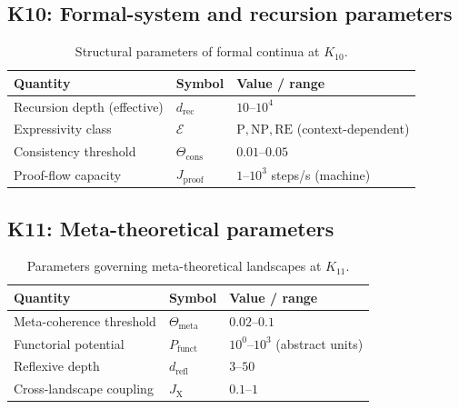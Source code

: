 
\subsection*{K10: Formal-system and recursion parameters}

\begin{table}[h]
  \centering
  \caption{Structural parameters of formal continua at \(K_{10}\).}
  \label{tab:k10-formal-parameters}
  \begin{tabular}{lll}
    \hline
    Quantity & Symbol & Value / range \\
    \hline
    Recursion depth (effective) & \(d_\mathrm{rec}\)
        & \(10\text{–}10^4\) \\
    Expressivity class & \(\mathcal{E}\)
        & \(\mathrm{P}, \mathrm{NP}, \mathrm{RE}\) (context-dependent) \\
    Consistency threshold & \(\Theta_\mathrm{cons}\)
        & \(0.01\text{–}0.05\) \\
    Proof-flow capacity & \(J_\mathrm{proof}\)
        & \(1\text{–}10^3\) steps/s (machine) \\
    \hline
  \end{tabular}
\end{table}


\subsection*{K11: Meta-theoretical parameters}

\begin{table}[h]
  \centering
  \caption{Parameters governing meta-theoretical landscapes at \(K_{11}\).}
  \label{tab:k11-meta-parameters}
  \begin{tabular}{lll}
    \hline
    Quantity & Symbol & Value / range \\
    \hline
    Meta-coherence threshold & \(\Theta_\mathrm{meta}\)
        & \(0.02\text{–}0.1\) \\
    Functorial potential & \(P_\mathrm{funct}\)
        & \(10^0\text{–}10^3\) (abstract units) \\
    Reflexive depth & \(d_\mathrm{refl}\)
        & \(3\text{–}50\) \\
    Cross-landscape coupling & \(J_\mathrm{X}\)
        & \(0.1\text{–}1\) \\
    \hline
  \end{tabular}
\end{table}

